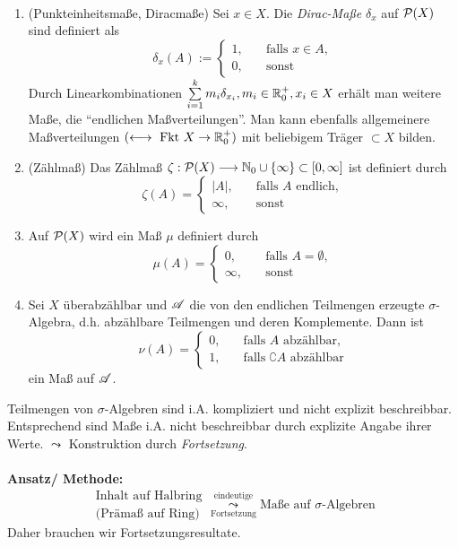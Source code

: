 \begin{example} \
\begin{enumerate}[label=(\roman*),topsep=3pt, itemsep=0pt]
	\item(Punkteinheitsmaße, Diracmaße) Sei $x\in X$. Die \emph{Dirac-Maße} $\delta_x$ auf $\PP(X)$ sind definiert als 
	$$
\delta_x(A):=\begin{cases}
	1, \quad &\text{falls }x \in A, \\
	0, \quad &\text{sonst}
\end{cases}	
	$$
	Durch Linearkombinationen $\sum\limits_{i=1}^k m_i \delta_{x_i}, m_i \in \R_0^+, x_i \in X$ erhält man weitere Maße, die ``endlichen Maßverteilungen''. Man kann ebenfalls allgemeinere Maßverteilungen $(\longleftrightarrow \text{ Fkt }X\to \R_0^+)$ mit beliebigem Träger $\subset X$ bilden.
	\item (Zählmaß) Das Zählmaß $\zeta:\PP(X) \longrightarrow \N_0 \cup \{\infty\} \subset [0,\infty]$ ist definiert durch
	$$\zeta(A)= \begin{cases}
	|A|, \quad &\text{falls $A$ endlich},\\
	\infty,\quad &\text{sonst}
	\end{cases}$$
	\item Auf $\PP(X)$ wird ein Maß $\mu$ definiert durch
	$$\mu(A)=\begin{cases}
		0, \quad &\text{falls } A = \emptyset, \\
		\infty, \quad &\text{sonst}
	\end{cases}$$
	\item Sei $X$ überabzählbar und $\AA$ die von den endlichen Teilmengen erzeugte $\sigma$-Algebra, d.h. abzählbare Teilmengen und deren Komplemente. Dann ist
	$$\nu(A)=\begin{cases}
	0, \quad &\text{falls } A \text{ abzählbar},\\
	1, \quad &\text{falls }\complement A \text{ abzählbar}
	\end{cases}$$
	ein Maß auf $\AA$.
\end{enumerate}
\end{example}

Teilmengen von $\sigma$-Algebren sind i.A. kompliziert und nicht explizit beschreibbar. Entsprechend sind Maße i.A. nicht beschreibbar durch explizite Angabe ihrer Werte. $\leadsto$ Konstruktion durch \emph{Fortsetzung}.
\\\\
\textbf{Ansatz/ Methode:}
\begin{equation*}
	\begin{array}{c}
	\text{Inhalt auf Halbring}\\
	\text{(Prämaß auf Ring)}
	\end{array}
	\underset{\text{Fortsetzung}}{\overset{\text{eindeutige}}\leadsto}
	\text{Maße auf $\sigma$-Algebren}
\end{equation*}
Daher brauchen wir Fortsetzungsresultate.

